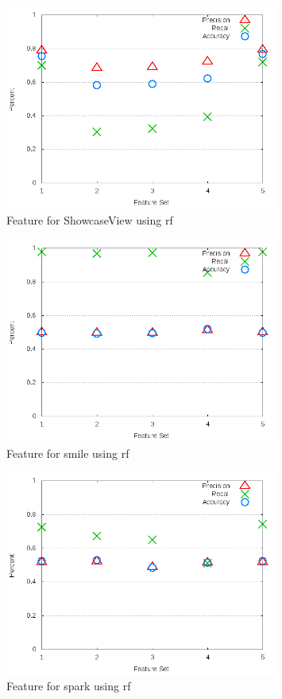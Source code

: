 \begin{figure}[!t]
\centering
\includegraphics[width=0.8\textwidth]{images/rf/test_3/ShowcaseView_sample_range.png}
\caption{Feature for ShowcaseView using \gls{rf}}
\label{fig:test_3_ShowcaseView_rf}
\end{figure}

\begin{figure}[!t]
\centering
\includegraphics[width=0.8\textwidth]{images/rf/test_3/smile_sample_range.png}
\caption{Feature for smile using \gls{rf}}
\label{fig:test_3_smile_rf}
\end{figure}

\begin{figure}[!t]
\centering
\includegraphics[width=0.8\textwidth]{images/rf/test_3/spark_sample_range.png}
\caption{Feature for spark using \gls{rf}}
\label{fig:test_3_spark_rf}
\end{figure}

